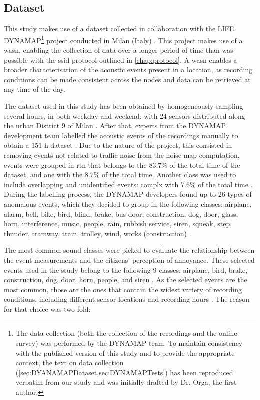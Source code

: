 \subsection{Dataset}
\label{sec:DYANAMAPDataset}
This study makes use of a dataset collected in collaboration with the LIFE DYNAMAP\footnote{The data collection (both the collection of the recordings and the online survey) was performed by the DYNAMAP team. To maintain consistency with the published version of this study and to provide the appropriate context, the text on data collection (\cref{sec:DYANAMAPDataset,sec:DYNAMAPTests}) has been reproduced verbatim from our study \citep{Orga2021Multilevel} and was initially drafted by Dr. Orga, the first author.} project conducted in Milan (Italy) \citep{Sevillano2016DYNAMAP,Alias2020WASN}. This project makes use of a \gls{wasn}, enabling the collection of data over a longer period of time than was possible with the \gls{ssid} protocol outlined in \cref{chap:protocol}. A \gls{wasn} enables a broader characterisation of the acoustic events present in a location, as recording conditions can be made consistent across the nodes and data can be retrieved at any time of the day.

The dataset used in this study has been obtained by homogeneously sampling several hours, in both weekday and weekend, with 24 sensors distributed along the urban District 9 of Milan \citep{AlsinaPages2018Detection}. After that, experts from the DYNAMAP development team labelled the acoustic events of the recordings manually to obtain a 151-h dataset \citep{Alias2020WASN}. Due to the nature of the project, this consisted in removing events not related to traffic noise from the noise map computation, events were grouped in \gls{rtn} that belongs to the 83.7\% of the total time of the dataset, and \gls{ane} with the 8.7\% of the total time. Another class was used to include overlapping and unidentified events: \gls{complx} with 7.6\% of the total time \citep{Alias2020Aggregate}. During the labelling process, the DYNAMAP developers found up to 26 types of anomalous events, which they decided to group in the following classes: airplane, alarm, bell, bike, bird, blind, brake, bus door, construction, dog, door, glass, horn, interference, music, people, rain, rubbish service, siren, squeak, step, thunder, tramway, train, trolley, wind, works (construction) \citep{Alias2017Description}.

The most common sound classes were picked to evaluate the relationship between the event measurements and the citizens' perception of annoyance. These selected events used in the study belong to the following 9 classes: airplane, bird, brake, construction, dog, door, horn, people, and siren \citep{Orga2017Impact}. As the selected events are the most common, those are the ones that contain the widest variety of recording conditions, including different sensor locations and recording hours \citep{LabairuTrenchs2018Noise}. The reason for that choice was two-fold:

